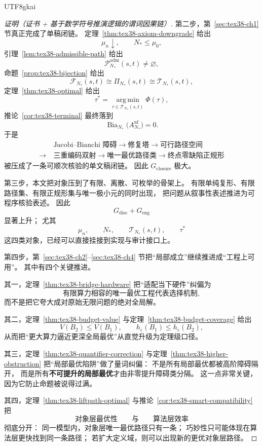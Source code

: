 \documentclass[12pt]{article}
\newcommand{\Bia}{\operatorname{Bia}}
\begin{document}
\begin{CJK*}{UTF8}{gkai}
\begin{proof}[证明（证书 + 基于数学符号推演逻辑的谓词因果链）]
第二步，第~\ref{sec:tex38-ch1} 节真正完成了单稿闭链。
定理~\ref{thm:tex38-axiom-downgrade} 给出
\[
  \mu_n\downarrow,
  \qquad
  N_\ast\le\mu_0,
\]
引理~\ref{lem:tex38-admissible-path} 给出
\[
  \mathcal{P}^{\mathrm{adm}}_{N_\ast}(s,t)\neq\varnothing,
\]
命题~\ref{prop:tex38-bijection} 给出
\[
  \mathcal{F}_{N_\ast}(s,t)
  \cong
  \Pi_{N_\ast}(s,t)
  \cong
  \mathcal{T}_{N_\ast}(s,t),
\]
定理~\ref{thm:tex38-optimal} 给出
\[
  \tau^\ast
  =
  \operatorname*{arg\,min}_{\tau\in\mathcal T_{N_\ast}(s,t)}
  \Phi(\tau),
\]
推论~\ref{cor:tex38-terminal} 最终落到
\[
  \Bia_{N_\ast}\bigl(A_{N_\ast}^{\mathrm{nf}}\bigr)=0.
\]
于是
\[
  \begin{aligned}
    &\text{Jacobi--Bianchi 障碍}
    \to
    \text{修复塔}
    \to
    \text{可行路径空间}\\
    \to\ &
    \text{三重编码双射}
    \to
    \text{唯一最优路径类}
    \to
    \text{终点零缺陷正规形}
  \end{aligned}
\]
被压成了一条可顺次核验的单文稿闭链。
因此 $G_{\mathrm{closure}}$ 极大。

第三步，本文把对象压到了有限、离散、可枚举的骨架上。
有限单纯复形、有限路径集、有限正规形集与唯一极小元的同时出现，
把问题从叙事性表述推进为可程序核验表述。
因此
\[
  G_{\mathrm{disc}}+G_{\mathrm{eng}}
\]
显著上升；
尤其
\[
  \mu_n,
  \qquad
  N_\ast,
  \qquad
  \mathcal T_{N_\ast}(s,t),
  \qquad
  \tau^\ast
\]
这四类对象，已经可以直接挂接到实现与审计接口上。

第四步，第~\ref{sec:tex38-ch2}--\ref{sec:tex38-ch4} 节把“局部成立”继续推进成“工程上可用”。
其中有四个关键推进。

其一，定理~\ref{thm:tex38-bridge-hardware} 把“适配当下硬件”纠偏为
\[
  \text{有限算力相容的唯一最优工程代表选择机制},
\]
而不是把它夸大成对原始无限问题的绝对全局解。

其二，定理~\ref{thm:tex38-budget-value} 与定理~\ref{thm:tex38-budget-coverage} 给出
\[
  V(B_2)\le V(B_1),
  \qquad
  h_\varepsilon(B_1)\le h_\varepsilon(B_2),
\]
从而把“更大算力逼近更深全局最优”从直觉升级为定理级口径。

其三，定理~\ref{thm:tex38-quantifier-correction} 与定理~\ref{thm:tex38-higher-obstruction} 把“局部最优陷阱”做了量词纠偏：
不是所有局部最优都被高阶障碍隔开，
而是所有\textbf{不可提升的局部最优}才由非零提升障碍类分隔。
这一点非常关键，因为它防止命题被说得过满。

其四，定理~\ref{thm:tex38-liftpath-optimal} 与推论~\ref{cor:tex38-smart-compatibility} 把
\[
  \text{对象层最优性}
  \qquad\text{与}\qquad
  \text{算法层效率}
\]
彻底分开：
同一模型内，对象层唯一最优路径只有一条；
巧妙性只可能体现在算法层更快找到同一条路径；
若扩大定义域，则可以出现新的更优对象层路径。


\end{proof}
\end{CJK*}
\end{document}

